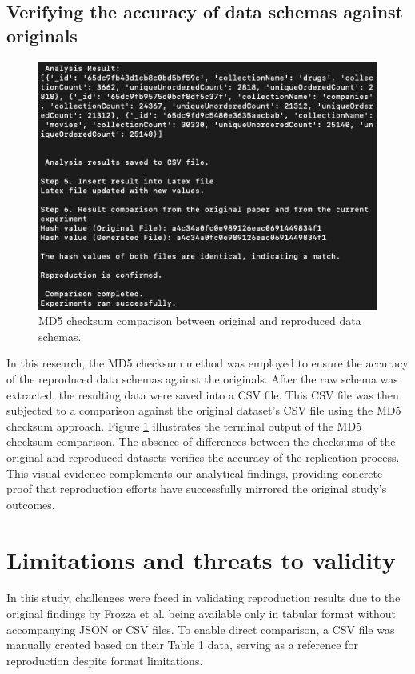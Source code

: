 \documentclass[sigconf, nonacm]{acmart}
\begin{document}
\subsection{Verifying the accuracy of data schemas against originals}

\begin{figure}[H]
    \centering
    \includegraphics[width=\linewidth]{figures/analysis_result.png} 
    \caption{MD5 checksum comparison between original and reproduced data schemas.}
    \label{fig:md5_comparison}
\end{figure}

In this research, the MD5 checksum method was employed to ensure the accuracy of the reproduced data schemas against the originals. After the raw schema was extracted, the resulting data were saved into a CSV file. This CSV file was then subjected to a comparison against the original dataset's CSV file using the MD5 checksum approach. Figure \ref{fig:md5_comparison} illustrates the terminal output of the MD5 checksum comparison. The absence of differences between the checksums of the original and reproduced datasets verifies the accuracy of the replication process. This visual evidence complements our analytical findings, providing concrete proof that reproduction efforts have successfully mirrored the original study's outcomes.

\section{Limitations and threats to validity}

In this study, challenges were faced in validating reproduction results due to the original findings by Frozza et al. being available only in tabular format without accompanying JSON or CSV files. To enable direct comparison, a CSV file was manually created based on their Table 1 data, serving as a reference for reproduction despite format limitations.



\end{document}
